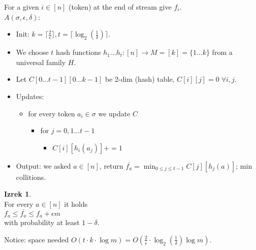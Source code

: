 \documentclass[a4paper, 12pt]{book}
\theoremstyle{definition}
\newtheorem{theorem}[counter]{Izrek}
\theoremstyle{remark}
\begin{document}
For a given $i \in [n]$ (token) at the end of stream give $f_i$. \\
$A(\sigma, \epsilon, \delta)$:
\begin{itemize}[label={}]
  \item Init: $k = \lceil \frac{2}{\epsilon} \rceil, t = \lceil \log_2 \left(\frac{1}{\delta}\right) \rceil$.
  \item We choose $t$ hash functions $h_1 \dots h_t: [n] \to M = [k] = \{1 \dots k\}$ from a universal family $H$.
  \item Let $C[0 \dots t-1][0 \dots k-1]$ be 2-dim (hash) table, $C[i][j] = 0 \; \forall i,j$.
  \item Updates:
    \begin{itemize}[label={}]
      \item for every token $a_i \in \sigma$ we update $C$
      \begin{itemize}[label={}]
        \item for $j = 0, 1 \dots t-1$
        \begin{itemize}[label={}]
          \item $C[i][h_i(a_j)] += 1$
        \end{itemize}
      \end{itemize}
    \end{itemize}
  \item Output: we asked $a \in [n]$, return $\overline{f_a} = \min_{0 \leq j \leq t-1} C[j][h_j(a)]$;
    min collitions.
\end{itemize}
\begin{theorem} \text{} \\
  For every $a \in [n]$ it holds \\
  $f_a \leq \overline{f_a} \leq f_a + \epsilon m$ \\
  with probability at least $1 - \delta$.
\end{theorem}
Notice: space needed $O(t \cdot k \cdot \log m) =
O\left(\frac{2}{\epsilon} \cdot \log_2 \left(\frac{1}{\delta}\right) \log m\right)$.
\end{document}
